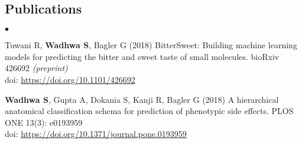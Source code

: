 \documentclass[margin,line]{res}
\newenvironment{list2}{
  \begin{list}{$\bullet$}{%
      \setlength{\itemsep}{0in}
      \setlength{\parsep}{0in} \setlength{\parskip}{0in}
      \setlength{\topsep}{0in} \setlength{\partopsep}{0in}
      \setlength{\leftmargin}{0.2in}}}{\end{list}}
\begin{document}
\begin{resume}
\section{\sc Publications}
\begin{list2}
\item Tuwani R, {\bf Wadhwa S}, Bagler G (2018) BitterSweet: Building machine learning models for predicting the bitter and sweet taste of small molecules. bioRxiv 426692 \textit{(preprint)}
\\doi: {\href{https://doi.org/10.1101/426692}{https://doi.org/10.1101/426692}}\\
\item {\bf Wadhwa S}, Gupta A, Dokania S, Kanji R, Bagler G (2018) A hierarchical anatomical classification schema for prediction of phenotypic side effects. PLOS ONE 13(3): e0193959
\\doi: {\href{https://doi.org/10.1371/journal.pone.0193959}{https://doi.org/10.1371/journal.pone.0193959}}
\end{list2}


\end{resume}
\end{document}
